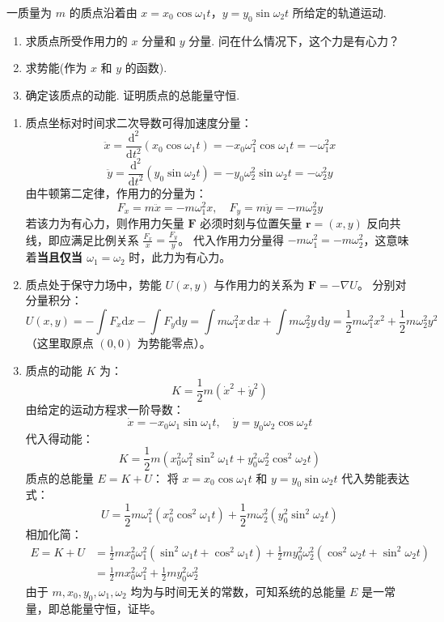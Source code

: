 \begin{exercise}\label{ex:4.10}
一质量为 $m$ 的质点沿着由 $x = x_0 \cos \omega_1 t$，$y = y_0 \sin \omega_2 t$ 所给定的轨道运动. 
\begin{enumerate}
  \item[(a)] 求质点所受作用力的 $x$ 分量和 $y$ 分量. 问在什么情况下，这个力是有心力？
  \item[(b)] 求势能(作为 $x$ 和 $y$ 的函数).
  \item[(c)] 确定该质点的动能. 证明质点的总能量守恒.
\end{enumerate}
\end{exercise}
\begin{solution}
\begin{enumerate}
    \item[(a)] 质点坐标对时间求二次导数可得加速度分量：
    $$ \ddot{x} = \frac{\mathrm{d}^2}{\mathrm{d}t^2}(x_0 \cos \omega_1 t) = -x_0 \omega_1^2 \cos \omega_1 t = -\omega_1^2 x $$
    $$ \ddot{y} = \frac{\mathrm{d}^2}{\mathrm{d}t^2}(y_0 \sin \omega_2 t) = -y_0 \omega_2^2 \sin \omega_2 t = -\omega_2^2 y $$
    由牛顿第二定律，作用力的分量为：
    $$ F_x = m\ddot{x} = -m\omega_1^2 x, \quad F_y = m\ddot{y} = -m\omega_2^2 y $$
    若该力为有心力，则作用力矢量 $\boldsymbol{F}$ 必须时刻与位置矢量 $\boldsymbol{r} = (x, y)$ 反向共线，即应满足比例关系 $\frac{F_x}{x} = \frac{F_y}{y}$。
    代入作用力分量得 $-m\omega_1^2 = -m\omega_2^2$，这意味着\textbf{当且仅当 $\omega_1 = \omega_2$} 时，此力为有心力。

    \item[(b)] 质点处于保守力场中，势能 $U(x,y)$ 与作用力的关系为 $\boldsymbol{F} = -\nabla U$。
    分别对分量积分：
    $$ U(x,y) = -\int F_x \mathrm{d}x - \int F_y \mathrm{d}y = \int m\omega_1^2 x \, \mathrm{d}x + \int m\omega_2^2 y \, \mathrm{d}y = \frac{1}{2}m\omega_1^2 x^2 + \frac{1}{2}m\omega_2^2 y^2 $$
    （这里取原点 $(0,0)$ 为势能零点）。

    \item[(c)] 质点的动能 $K$ 为：
    $$ K = \frac{1}{2}m(\dot{x}^2 + \dot{y}^2) $$
    由给定的运动方程求一阶导数：
    $$ \dot{x} = -x_0 \omega_1 \sin \omega_1 t, \quad \dot{y} = y_0 \omega_2 \cos \omega_2 t $$
    代入得动能：
    $$ K = \frac{1}{2}m \left( x_0^2 \omega_1^2 \sin^2 \omega_1 t + y_0^2 \omega_2^2 \cos^2 \omega_2 t \right) $$
    质点的总能量 $E = K + U$：
    将 $x = x_0 \cos \omega_1 t$ 和 $y = y_0 \sin \omega_2 t$ 代入势能表达式：
    $$ U = \frac{1}{2}m\omega_1^2 (x_0^2 \cos^2 \omega_1 t) + \frac{1}{2}m\omega_2^2 (y_0^2 \sin^2 \omega_2 t) $$
    相加化简：
    \begin{align*}
        E = K + U &= \frac{1}{2}m x_0^2 \omega_1^2 (\sin^2 \omega_1 t + \cos^2 \omega_1 t) + \frac{1}{2}m y_0^2 \omega_2^2 (\cos^2 \omega_2 t + \sin^2 \omega_2 t) \\
                  &= \frac{1}{2}m x_0^2 \omega_1^2 + \frac{1}{2}m y_0^2 \omega_2^2
    \end{align*}
    由于 $m, x_0, y_0, \omega_1, \omega_2$ 均为与时间无关的常数，可知系统的总能量 $E$ 是一常量，即总能量守恒，证毕。
\end{enumerate}
\end{solution}


